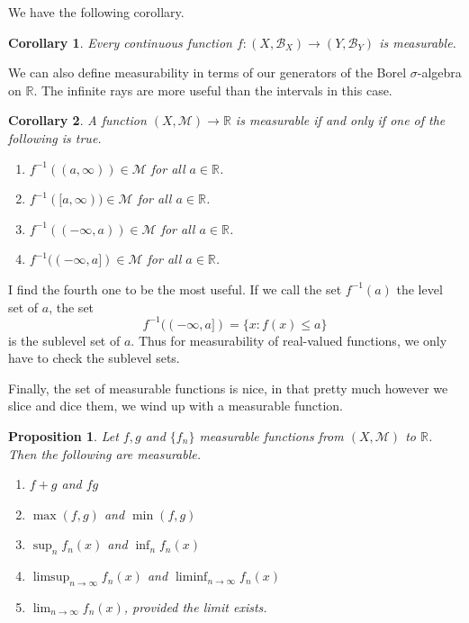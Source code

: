 \documentclass[12pt]{amsart}         %
\newtheorem{proposition}{Proposition}[section]
\newtheorem{corollary}{Corollary}[section]
\theoremstyle{remark}
\newcommand{\R}{\mathbb{R}}
\begin{document}
We have the following corollary.

\begin{corollary}
Every continuous function $f: (X,\mathcal{B}_X) \rightarrow (Y,\mathcal{B}_Y)$ is measurable.
\end{corollary}

We can also define measurability in terms of our generators of the Borel $\sigma$-algebra on $\R$. The infinite rays are more useful than the intervals in this case.

\begin{corollary}
A function $(X,\mathcal{M}) \rightarrow \R$ is measurable if and only if one of the following is true.
\begin{enumerate}
    \item $f^{-1}((a,\infty)) \in \mathcal{M}$ for all $a \in \R$.
    \item $f^{-1}([a,\infty)) \in \mathcal{M}$ for all $a \in \R$.
    \item $f^{-1}((-\infty,a)) \in \mathcal{M}$ for all $a \in \R$.
    \item $f^{-1}((-\infty,a]) \in \mathcal{M}$ for all $a \in \R$.
\end{enumerate}
\end{corollary}

I find the fourth one to be the most useful. If we call the set $f^{-1}(a)$ the level set of $a$, the set 
\[
f^{-1}((-\infty,a]) = \{ x : f(x) \leq a \}
\]
is the sublevel set of $a$. Thus for measurability of real-valued functions, we only have to check the sublevel sets.

Finally, the set of measurable functions is nice, in that pretty much however we slice and dice them, we wind up with a measurable function.

\begin{proposition}
Let $f, g$ and $\{ f_n \}$ measurable functions from $(X, \mathcal{M})$ to $\R$. Then the following are measurable.
\begin{enumerate}
\item $f + g$ and $fg$
\item $\max(f, g)$ and $\min(f, g)$
\item $\sup_n f_n(x)$ and $\inf_n f_n(x)$
\item $\limsup_{n\rightarrow\infty} f_n(x)$ and $\liminf_{n\rightarrow\infty} f_n(x)$
\item $\lim_{n\rightarrow\infty} f_n(x)$, provided the limit exists.
\end{enumerate}
\end{proposition}
\end{document}
